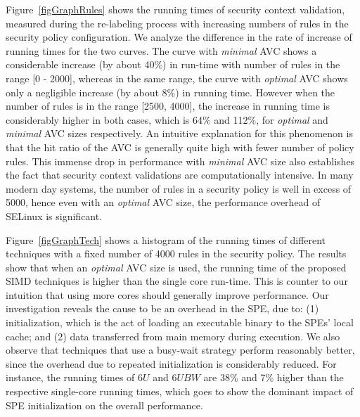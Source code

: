 \documentclass[conference]{IEEEtran}
\begin{document}
Figure~\ref{figGraphRules} shows the running times of security context
validation, measured during the re-labeling process with increasing
numbers of rules in the security policy configuration.  We analyze the
difference in the rate of increase of running times for the two
curves.  The curve with \emph{minimal} AVC shows a considerable increase (by about
40\%) in run-time with number of rules in the range [0 - 2000],
whereas in the same range, the curve with \emph{optimal} AVC shows only a negligible
increase (by about 8\%) in running time.  However when the number of
rules is in the range [2500, 4000], the increase in running time is
considerably higher in both cases, which is 64\% and 112\%, for \emph{optimal}
and \emph{minimal} AVC sizes respectively.  An intuitive explanation for this
phenomenon is that the hit ratio of the AVC is generally quite high
with fewer number of policy rules.  This immense drop in performance
with \emph{minimal} AVC size also establishes the fact that security context
validations are computationally intensive.  In many modern day
systems, the number of rules in a security policy is well in excess of
5000, hence even with an \emph{optimal} AVC size, the performance overhead
of SELinux is significant.

Figure~\ref{figGraphTech} shows a histogram of the running times of
different techniques with a fixed number of 4000 rules in the security
policy.  The results show that when an \emph{optimal} AVC size is used, the running
time of the proposed SIMD techniques is higher than the single core
run-time.  This is counter to our intuition that using more cores
should generally improve performance.  Our investigation reveals the
cause to be an overhead in the SPE, due to: (1) initialization, which
is the act of loading an executable binary to the SPEs' local cache;
and (2) data transferred from main memory during execution.  We also
observe that techniques that use a busy-wait strategy perform
reasonably better, since the overhead due to repeated initialization
is considerably reduced.  For instance, the running times of $6U$ and
$6UBW$ are 38\% and 7\% higher than the respective single-core running
times, which goes to show the dominant impact of SPE initialization on
the overall performance.
\end{document}
